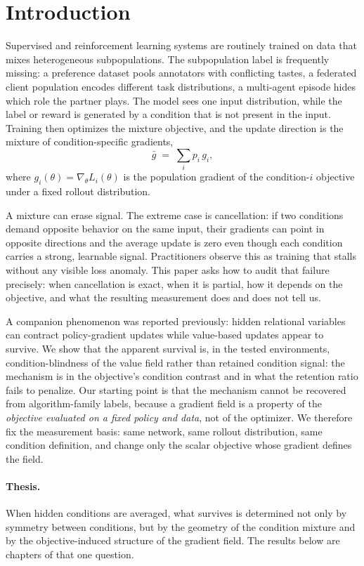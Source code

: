 \documentclass{article}
\newcommand{\gbar}{\bar{g}}
\begin{document}
\section{Introduction}
\label{sec:intro}

Supervised and reinforcement learning systems are routinely trained on data
that mixes heterogeneous subpopulations. The subpopulation label is frequently
missing: a preference dataset pools annotators with conflicting tastes, a
federated client population encodes different task distributions, a
multi-agent episode hides which role the partner plays. The model sees one
input distribution, while the label or reward is generated by a condition that
is not present in the input. Training then optimizes the mixture objective, and
the update direction is the mixture of condition-specific gradients,
\begin{equation}
\gbar \;=\; \sum_i p_i \, g_i ,
\end{equation}
where $g_i(\theta)=\nabla_\theta L_i(\theta)$ is the population gradient of the
condition-$i$ objective under a fixed rollout distribution.

A mixture can erase signal. The extreme case is cancellation: if two conditions
demand opposite behavior on the same input, their gradients can point in
opposite directions and the average update is zero even though each condition
carries a strong, learnable signal. Practitioners observe this as training that
stalls without any visible loss anomaly. This paper asks how to audit that
failure precisely: when cancellation is exact, when it is partial, how it
depends on the objective, and what the resulting measurement does and does not
tell us.

A companion phenomenon was reported previously: hidden relational variables
can contract policy-gradient updates while value-based updates appear to
survive. We show that the apparent survival is, in the tested environments,
condition-blindness of the value field rather than retained condition signal:
the mechanism is in the objective's condition contrast and in what the
retention ratio fails to penalize. Our starting point is that the
mechanism cannot be recovered from algorithm-family labels, because a gradient
field is a property of the \emph{objective evaluated on a fixed policy and
data}, not of the optimizer. We therefore fix the measurement basis: same
network, same rollout distribution, same condition definition, and change only
the scalar objective whose gradient defines the field.

\paragraph{Thesis.}
When hidden conditions are averaged, what survives is determined not only by
symmetry between conditions, but by the geometry of the condition mixture and
by the objective-induced structure of the gradient field. The results below
are chapters of that one question.
\end{document}
